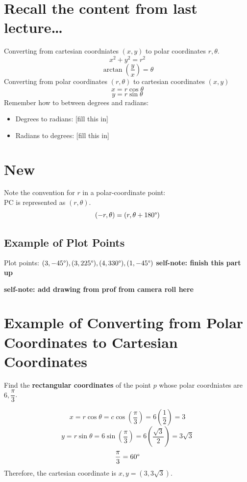\documentclass{article}
\begin{document}
\renewcommand{\familydefault}{\rmdefault}




\normalsize

\section*{Recall the content from last lecture\dots}
\begin{notebox}
Converting from cartesian coordniates \( (x, y) \) to polar coordinates \( r, \theta \).
\[
    x^2 + y^2 = r^2
\]
\[
    \arctan(\dfrac{y}{x}) = \theta
\]
Converting from polar coordinates \( (r, \theta) \) to cartesian coordinates \( (x, y) \) 
\[
    x = r\cos\theta
\]
\[
    y = r\sin\theta
\]
Remember how to between degrees and radians:
\begin{itemize}
    \item Degrees to radians: [fill this in]
    \item Radians to degrees: [fill this in]
\end{itemize}
\end{notebox}

\section*{New}
\begin{conceptbox}
Note the convention for \( r \) in a polar-coordinate point: \\
PC is represented as \( (r, \theta) \).
\[
    (-r, \theta) = (r, \theta + 180\text{\textdegree})
\]
\end{conceptbox}

\subsection*{Example of Plot Points}
\begin{examplebox}
Plot points: \( (3, -45\text{\textdegree}), (3, 225\text{\textdegree}), (4, 330\text{\textdegree}), (1, -45\text{\textdegree}) \)
\textbf{self-note: finish this part up}


\textbf{self-note: add drawing from prof from camera roll here}
\end{examplebox}

\section*{Example of Converting from Polar Coordinates to Cartesian Coordinates}
\begin{examplebox}
Find the \textbf{rectangular coordinates} of the point \( p \) whose polar coordniates are \( 6, \dfrac{\pi}{3}\).

\begin{solutionbox}
\[
    x = r\cos\theta = c\cos(\dfrac{\pi}{3}) = 6(\frac{1}{2}) = 3
\]
\[
    y = r\sin\theta=6\sin(\dfrac{\pi}{3}) = 6(\frac{\sqrt{3}}{2}) = 3\sqrt{3} 
\]
\[
    \frac{\pi}{3} = 60\text{\textdegree}
\]
Therefore, the cartesian coordinate is \( x, y = (3, 3\sqrt{3}) \).
\end{solutionbox}
\end{examplebox}
\end{document}
